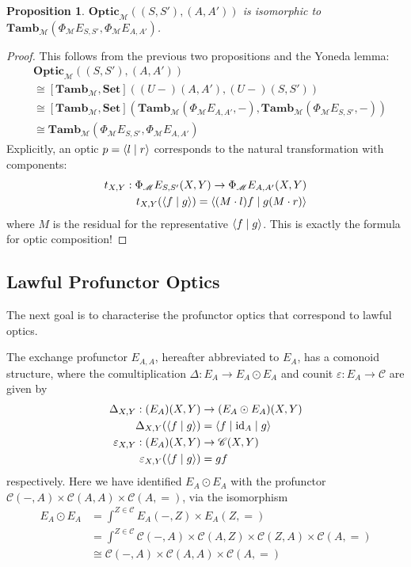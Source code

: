 \documentclass[11pt,letterpaper]{article}
\theoremstyle{plain}
\newtheorem{proposition}[theorem]{Proposition}
\theoremstyle{definition}
\newcommand{\C}{\mathscr{C}}
\newcommand{\M}{\mathscr{M}}
\newcommand{\Pastro}{\Phi}
\newcommand{\Set}{\mathbf{Set}}
\newcommand{\Tamb}{\mathbf{Tamb}}
\newcommand{\Optic}{\mathbf{Optic}}
\newcommand{\id}{\mathrm{id}}
\newcommand{\act}{\cdot}
\newcommand{\rep}[2]{{\ensuremath \left\langle #1 \mid #2 \right\rangle}}
\newcommand{\repthree}[3]{{\ensuremath \langle #1 \mid #2 \mid #3 \rangle}}
\begin{document}
\begin{proposition}
  $\Optic_\M((S, S'), (A, A'))$ is isomorphic to $\Tamb_\M(\Pastro_\M E_{S, S'}, \Pastro_\M E_{A, A'})$.
\end{proposition}
\begin{proof}
This follows from the previous two propositions and the Yoneda lemma:
\begin{align*}
  &\Optic_\M((S, S'), (A, A')) \\
  &\cong [\Tamb_\M, \Set]((U-)(A,A'),(U-)(S,S')) \\
  &\cong [\Tamb_\M, \Set](\Tamb_\M(\Pastro_\M E_{A, A'}, -),\Tamb_\M(\Pastro_\M E_{S, S'}, -)) \\
    &\cong \Tamb_\M(\Pastro_\M E_{S, S'}, \Pastro_\M E_{A, A'})
\end{align*}
Explicitly, an optic $p = \rep{l}{r}$ corresponds to the natural transformation with components:
\begin{align*}
t_{X, Y} : \Pastro_\M E_{S, S'}(X, Y) \to \Pastro_\M E_{A, A'}(X, Y) \\
t_{X, Y}(\rep{f}{g}) = \rep{(M\act l)f}{g(M\act r)}
\end{align*}
where $M$ is the residual for the representative $\rep{f}{g}$.
This is exactly the formula for optic composition!
\end{proof}

\subsection{Lawful Profunctor Optics}

The next goal is to characterise the profunctor optics that correspond to lawful optics.

The exchange profunctor $E_{A, A}$, hereafter abbreviated to $E_A$, has a comonoid structure, where the comultiplication $\Delta : E_A \to E_A \odot E_A$ and counit $\varepsilon : E_A \to \C$ are given by
\begin{align*}
  \Delta_{X, Y} : (E_A)(X, Y) &\to (E_A \odot E_A)(X, Y) \\
  \Delta_{X, Y}(\rep{f}{g}) &= \repthree{f}{\id_A}{g}  \\
  \varepsilon_{X, Y} : (E_A)(X, Y) &\to \C(X, Y) \\
  \varepsilon_{X, Y}(\rep{f}{g}) &= gf
\end{align*}
respectively. Here we have identified $E_A \odot E_A$ with the profunctor $\C(-, A) \times \C(A, A) \times \C(A, =)$, via the isomorphism
\begin{align*}
E_A \odot E_A 
&= \int^{Z \in \C} E_A(-, Z) \times E_A(Z, =) \\
&= \int^{Z \in \C} \C(-, A) \times \C(A, Z) \times \C(Z, A) \times \C(A, =) \\
&\cong \C(-, A) \times \C(A, A) \times \C(A, =) 
\end{align*}
\end{document}
